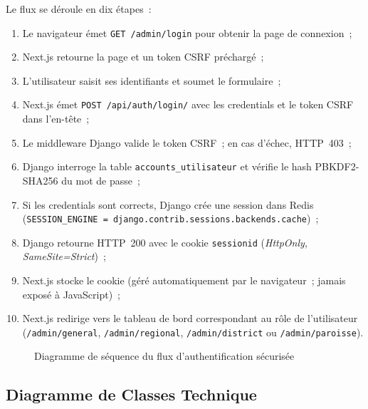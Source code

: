 \documentclass[12pt, a4paper]{report}
\begin{document}
Le flux se déroule en dix étapes~:
\begin{enumerate}[itemsep=2pt, topsep=4pt, leftmargin=1.8cm]
  \item Le navigateur émet \texttt{GET /admin/login} pour obtenir la page
    de connexion~;
  \item Next.js retourne la page et un token CSRF préchargé~;
  \item L'utilisateur saisit ses identifiants et soumet le formulaire~;
  \item Next.js émet \texttt{POST /api/auth/login/} avec les credentials
    et le token CSRF dans l'en-tête~;
  \item Le middleware Django valide le token CSRF~; en cas d'échec, HTTP~403~;
  \item Django interroge la table \texttt{accounts\_utilisateur} et vérifie
    le hash PBKDF2-SHA256 du mot de passe~;
  \item Si les credentials sont corrects, Django crée une session dans Redis
    (\texttt{SESSION\_ENGINE = django.contrib.sessions.backends.cache})~;
  \item Django retourne HTTP~200 avec le cookie \texttt{sessionid}
    (\textit{HttpOnly, SameSite=Strict})~;
  \item Next.js stocke le cookie (géré automatiquement par le navigateur~;
    jamais exposé à JavaScript)~;
  \item Next.js redirige vers le tableau de bord correspondant au rôle de
    l'utilisateur (\texttt{/admin/general}, \texttt{/admin/regional},
    \texttt{/admin/district} ou \texttt{/admin/paroisse}).
\end{enumerate}

\begin{figure}[htbp]
  \centering
  \caption{Diagramme de séquence du flux d'authentification sécurisée}
  \label{fig:diag-sequence}
\end{figure}

\subsection{Diagramme de Classes Technique}
\label{ssec:classes-tech}
\end{document}
